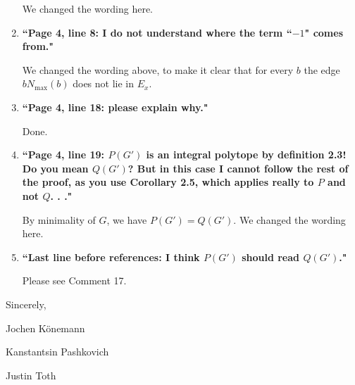 \documentclass[11pt]{article}
\begin{document}
\begin{enumerate}
	We changed the wording here.
	
	\bigskip
	
	
	\item \textbf{``Page 4, line 8: I do not understand where the term ``$-1$" comes from."}
	
	\smallskip
	
	We changed the wording above, to make it clear that for every $b$ the edge $b N_{\max}(b)$ does not lie in $E_x$.
	
	\bigskip
	
	\item \textbf{``Page 4, line 18: please explain why."}
	
	\smallskip
	
	Done.
	
	\bigskip
	
		\item \textbf{``Page 4, line 19: $P(G')$ is an integral polytope by definition 2.3! Do you mean $Q(G')$? But in this case I cannot follow the rest of the proof, as you use Corollary 2.5, which applies really to $P$ and not $Q$. . ."}
	
	\smallskip
	
	By minimality of $G$, we have $P(G')=Q(G')$. We changed the wording here.
	
	\bigskip
	
	\item \textbf{``Last line before references: I think $P(G')$ should read $Q(G')$."}
	
	Please see Comment 17.

	
\end{enumerate}

 Sincerely,

\smallskip

\qquad Jochen K\"{o}nemann

\qquad  Kanstantsin Pashkovich

\qquad  Justin Toth
\end{document}
